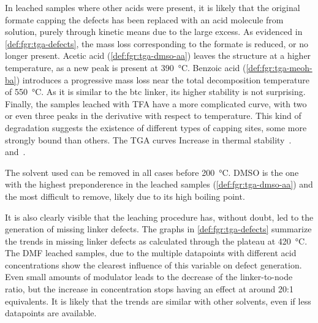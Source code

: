 In leached samples where other acids were present,
it is likely that the original formate capping the defects 
has been replaced with an acid molecule from solution,
purely through kinetic means due to the large excess.
As evidenced in \autoref{def:fgr:tga-defects}, the mass 
loss corresponding to the formate is reduced, or no longer present. 
Acetic acid (\autoref{def:fgr:tga-dmso-aa}) leaves the 
structure at a higher temperature, as 
a new peak is present at \SI{390}{\degreeCelsius}.
Benzoic acid (\autoref{def:fgr:tga-meoh-ba}) introduces a progressive 
mass loss near the total decomposition temperature of \SI{550}{\degreeCelsius}.
As it is similar to the btc linker, its higher stability
is not surprising. Finally, the samples leached with 
TFA have a more complicated curve, with two or even 
three peaks in the derivative with respect to temperature.
This kind of degradation suggests the existence of different types
of capping sites, some more strongly bound than others. The TGA curves 
Increase in thermal stability~\cite{vandevoordeImprovingMechanicalStability2015}.
and~\cite{jiaoHeatTreatmentDefectiveUiO662017}.

The solvent used can be removed in all cases before 
\SI{200}{\degreeCelsius}. DMSO is the one with the highest
preponderence in the leached samples (\autoref{def:fgr:tga-dmso-aa}) 
and the most difficult to remove, likely due to its high boiling point.

It is also clearly visible that the leaching procedure has,
without doubt, led to the generation of missing linker 
defects. The graphs in \autoref{def:fgr:tga-defects} summarize the 
trends in missing linker defects as calculated through 
the plateau at \SI{420}{\degreeCelsius}. The DMF leached samples,
due to the multiple datapoints with different acid concentrations
show the clearest influence of this variable on defect
generation. Even small amounts of modulator leads to the decrease of 
the linker-to-node ratio, but the increase in concentration stops 
having an effect at around 20:1 equivalents. It is likely that
the trends are similar with other solvents, even if less 
datapoints are available.

